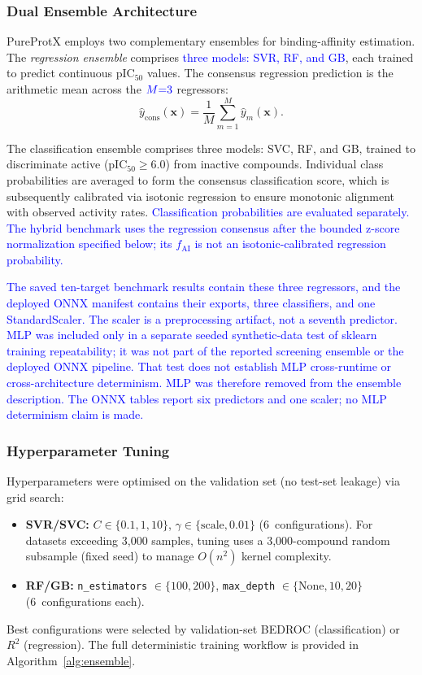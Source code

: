 \documentclass[conference]{IEEEtran}
\newcommand{\rev}[2]{\textcolor{blue}{#2}}
\begin{document}
\subsubsection{Dual Ensemble Architecture}
PureProtX employs two complementary ensembles for
binding-affinity estimation.
The \emph{regression ensemble} comprises \rev{R2.1}{three models: SVR, RF, and GB}, each trained to predict continuous
pIC$_{50}$ values.
The consensus regression prediction is the arithmetic
mean across the $\rev{R2.1}{M{=}3}$ regressors:
\begin{equation}
\label{eq:consensus-reg}
\hat{y}_{\mathrm{cons}}(\mathbf{x})
  = \frac{1}{M}\sum_{m=1}^{M}\hat{y}_m(\mathbf{x}).
\end{equation}

The classification ensemble comprises three models:
SVC, RF, and GB, trained to discriminate active
(pIC$_{50} \geq 6.0$) from inactive compounds.
Individual class probabilities are averaged to form the
consensus classification score, which is subsequently
calibrated via isotonic regression to ensure monotonic
alignment with observed activity rates.
\rev{R2.3}{Classification probabilities are evaluated separately.
The hybrid benchmark uses the regression consensus after the
bounded z-score normalization specified below; its $f_{\mathrm{AI}}$
is not an isotonic-calibrated regression probability.}

\rev{R2.1}{The saved ten-target benchmark results contain these
three regressors, and the deployed ONNX manifest contains their
exports, three classifiers, and one StandardScaler. The scaler is
a preprocessing artifact, not a seventh predictor. MLP was included
only in a separate seeded synthetic-data test of sklearn training
repeatability; it was not part of the reported screening ensemble
or the deployed ONNX pipeline. That test does not establish MLP
cross-runtime or cross-architecture determinism. MLP was therefore removed from the ensemble description. The ONNX tables report six
predictors and one scaler; no MLP determinism claim is made.}

\subsubsection{Hyperparameter Tuning}
Hyperparameters were optimised on the validation set
(no test-set leakage) via grid search:
\begin{itemize}
    \item \textbf{SVR/SVC:} $C \in \{0.1, 1, 10\}$,
    $\gamma \in \{\mathrm{scale}, 0.01\}$ (6~configurations).
    For datasets exceeding 3{,}000 samples, tuning uses
    a 3{,}000-compound random subsample (fixed seed) to
    manage $O(n^2)$ kernel complexity.
    \item \textbf{RF/GB:} \texttt{n\_estimators}
    $\in \{100, 200\}$, \texttt{max\_depth}
    $\in \{\mathrm{None}, 10, 20\}$ (6~configurations each).
\end{itemize}
Best configurations were selected by validation-set BEDROC
(classification) or $R^2$ (regression).
The full deterministic training workflow is provided
in Algorithm~\ref{alg:ensemble}.
\end{document}
